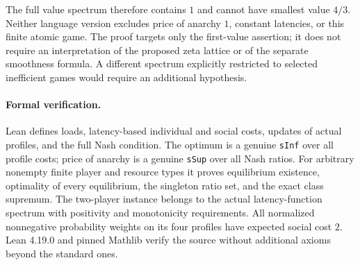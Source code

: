 \documentclass[11pt]{article}
\begin{document}
The full value spectrum therefore contains $1$ and cannot have smallest value $4/3$. Neither language version excludes price of anarchy $1$, constant latencies, or this finite atomic game. The proof targets only the first-value assertion; it does not require an interpretation of the proposed zeta lattice or of the separate smoothness formula. A different spectrum explicitly restricted to selected inefficient games would require an additional hypothesis.

\paragraph{Formal verification.}
Lean defines loads, latency-based individual and social costs, updates of actual profiles, and the full Nash condition. The optimum is a genuine \texttt{sInf} over all profile costs; price of anarchy is a genuine \texttt{sSup} over all Nash ratios. For arbitrary nonempty finite player and resource types it proves equilibrium existence, optimality of every equilibrium, the singleton ratio set, and the exact class supremum. The two-player instance belongs to the actual latency-function spectrum with positivity and monotonicity requirements. All normalized nonnegative probability weights on its four profiles have expected social cost $2$. Lean 4.19.0 and pinned Mathlib verify the source without additional axioms beyond the standard ones.
\end{document}
